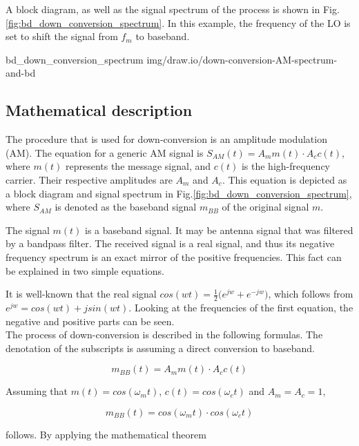 A block diagram, as well as the signal spectrum of the process is shown in Fig.\ref{fig:bd_down_conversion_spectrum}. In this example, the frequency of the LO is set to shift the signal from $f_m$ to baseband.

 {bd_down_conversion_spectrum} {img/draw.io/down-conversion-AM-spectrum-and-bd}

\subsection{Mathematical description}

The procedure that is used for down-conversion is an amplitude modulation (AM).
The equation for a generic AM signal is $ S_{AM}(t) = A_m m(t) \cdot A_c c(t) $, where $m(t)$ represents the message signal, and $c(t)$ is the high-frequency carrier.
Their respective amplitudes are $A_m$ and $A_c$.
This equation is depicted as a block diagram and signal spectrum in Fig.\ref{fig:bd_down_conversion_spectrum}, where $S_{AM}$ is denoted as the baseband signal $m_{BB}$ of the original signal $m$.

The signal $m(t)$ is a baseband signal.
It may be antenna signal that was filtered by a bandpass filter.
The received signal is a real signal, and thus its negative frequency spectrum is an exact mirror of the positive frequencies.
This fact can be explained in two simple equations.

It is well-known that the real signal $cos(wt) = \frac{1}{2} \Big( e^{jw} + e^{-jw} \Big)$, which follows from $e^{jw} = cos(wt)+jsin(wt)$.
Looking at the frequencies of the first equation, the negative and positive parts can be seen.\\

The process of down-conversion is described in the following formulas.
The denotation of the subscripts is assuming a direct conversion to baseband.

\begin{equation}
  m_{BB}(t) = A_m m(t) \cdot A_c c(t)
\end{equation}

Assuming that $m(t) = cos(\omega_mt)$, $c(t) = cos(\omega_ct)$ and $A_m = A_c = 1$,

\begin{equation}
  m_{BB}(t) = cos(\omega_mt) \cdot cos(\omega_ct)
\end{equation}

follows.
By applying the mathematical theorem

